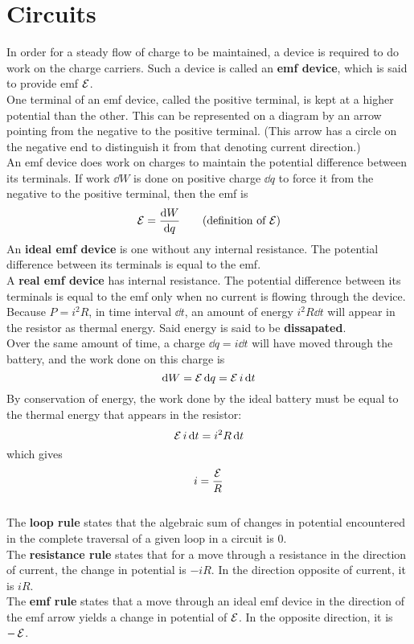 \documentclass[./Electricity and Magnetism.tex]{subfiles}
\begin{document}
	\section{Circuits}
		In order for a steady flow of charge to be maintained, a device is required to do work on the charge carriers. Such a device is called an \textbf{emf device}, which is said to provide emf \(\operatorname{\mathcal{E}}\). \\
		One terminal of an emf device, called the positive terminal, is kept at a higher potential than the other. This can be represented on a diagram by an arrow pointing from the negative to the positive terminal. (This arrow has a circle on the negative end to distinguish it from that denoting current direction.) \\
		An emf device does work on charges to maintain the potential difference between its terminals. If work \(\dd{W}\) is done on positive charge \(\dd{q}\) to force it from the negative to the positive terminal, then the emf is
			\[\emf = \dv{W}{q} \tag{definition of \(\emf\)}\]
		An \textbf{ideal emf device} is one without any internal resistance. The potential difference between its terminals is equal to the emf. \\
		A \textbf{real emf device} has internal resistance. The potential difference between its terminals is equal to the emf only when no current is flowing through the device. \\
		Because \(P = i^2R\), in time interval \(\dd{t}\), an amount of energy \(i^2R\dd{t}\) will appear in the resistor as thermal energy. Said energy is said to be \textbf{dissapated}. \\
			Over the same amount of time, a charge \(\dd{q} = i\dd{t}\) will have moved through the battery, and the work done on this charge is
			\[
				\dd{W} = \operatorname{\mathcal{E}}\dd{q}
					= \operatorname{\mathcal{E}} i\dd{t}
			\]
			By conservation of energy, the work done by the ideal battery must be equal to the thermal energy that appears in the resistor:
				\[\operatorname{\mathcal{E}} i\dd{t} = i^2R\dd{t}\]
				which gives
				\[i = \frac{\operatorname{\mathcal{E}}}{R}\] \\
		The \textbf{loop rule} states that the algebraic sum of changes in potential encountered in the complete traversal of a given loop in a circuit is 0. \\
		The \textbf{resistance rule} states that for a move through a resistance in the direction of current, the change in potential is \(-iR\). In the direction opposite of current, it is \(iR\). \\
		The \textbf{emf rule} states that a move through an ideal emf device in the direction of the emf arrow yields a change in potential of \(\operatorname{\mathcal{E}}\). In the opposite direction, it is \(-\operatorname{\mathcal{E}}\). \\
\end{document}

